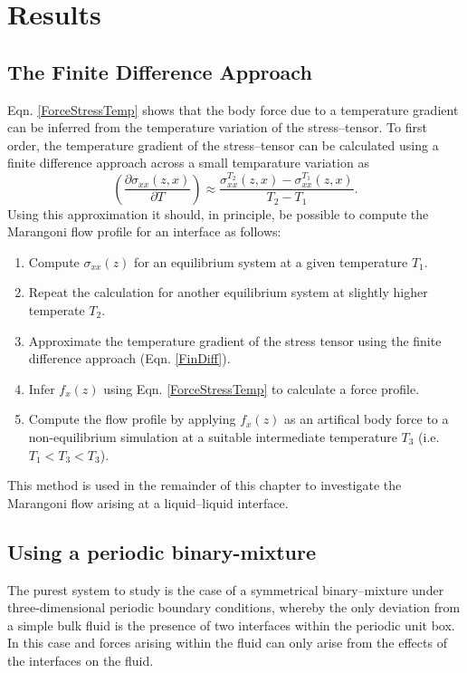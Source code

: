 \section{Results}
\subsection{The Finite Difference Approach}
Eqn. \ref{ForceStressTemp} shows that the body force due to a temperature gradient can be inferred from the temperature variation of the stress--tensor. 
To first order, the temperature gradient of the stress--tensor can be calculated using a finite difference approach across a small temparature variation as
\begin{equation}
\label{FinDiff}
\left( \frac{\partial \sigma_{xx}(z,x)}{\partial T} \right) \approx \frac{\sigma_{xx}^{T_{2}}(z,x) - \sigma_{xx}^{T_{1}}(z,x)}{T_{2} - T_{1}}.
\end{equation}
Using this approximation it should, in principle, be possible to compute the Marangoni flow profile for an interface as follows:
\begin{enumerate}
	\item Compute $\sigma_{xx}(z)$ for an equilibrium system at a given temperature $T_{1}$.
	\item Repeat the calculation for another equilibrium system at slightly higher temperate $T_{2}$.
	\item Approximate the temperature gradient of the stress tensor using the finite difference approach (Eqn. \ref{FinDiff}).
	\item Infer $f_{x}(z)$ using Eqn. \ref{ForceStressTemp} to calculate a force profile.
	\item Compute the flow profile by applying $f_{x}(z)$ as an artifical body force to a non-equilibrium simulation at a suitable intermediate temperature $T_{3}$ (i.e. $T_{1} < T_{3} < T_{3}$).
\end{enumerate}

This method is used in the remainder of this chapter to investigate the Marangoni flow arising at a liquid--liquid interface. 

\subsection{Using a periodic binary-mixture}
The purest system to study is the case of a symmetrical binary--mixture under three-dimensional periodic boundary conditions, whereby the only deviation from a simple bulk fluid is the presence of two interfaces within the periodic unit box. 
In this case and forces arising within the fluid can only arise from the effects of the interfaces on the fluid.

